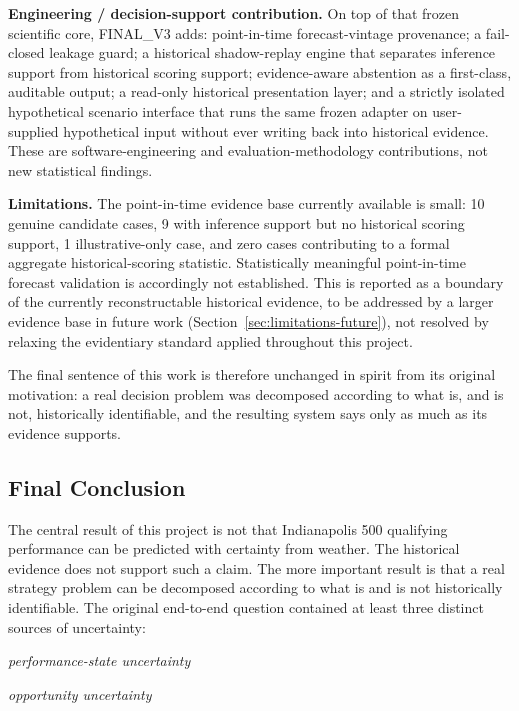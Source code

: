 \textbf{Engineering / decision-support contribution.} On top of that frozen scientific core, FINAL\_V3 adds:
point-in-time forecast-vintage provenance; a fail-closed leakage guard; a historical shadow-replay engine that
separates inference support from historical scoring support; evidence-aware abstention as a first-class,
auditable output; a read-only historical presentation layer; and a strictly isolated hypothetical scenario
interface that runs the same frozen adapter on user-supplied hypothetical input without ever writing back
into historical evidence. These are software-engineering and evaluation-methodology contributions, not new
statistical findings.

\textbf{Limitations.} The point-in-time evidence base currently available is small: 10 genuine candidate
cases, 9 with inference support but no historical scoring support, 1 illustrative-only case, and zero cases
contributing to a formal aggregate historical-scoring statistic. Statistically meaningful point-in-time
forecast validation is accordingly not established. This is reported as a boundary of the currently
reconstructable historical evidence, to be addressed by a larger evidence base in future work
(Section~\ref{sec:limitations-future}), not resolved by relaxing the evidentiary standard applied throughout
this project.

The final sentence of this work is therefore unchanged in spirit from its original motivation: a real decision
problem was decomposed according to what is, and is not, historically identifiable, and the resulting system
says only as much as its evidence supports.


\subsection{Final Conclusion}
The central result of this project is not that Indianapolis 500 qualifying performance can be predicted with certainty from weather. The historical evidence does not support such a claim. The more important result is that a real strategy problem can be decomposed according to what is and is not historically identifiable. The original end-to-end question contained at least three distinct sources of uncertainty:

\begin{center}\textit{performance-state uncertainty}\end{center}

\begin{center}\textit{opportunity uncertainty}\end{center}

